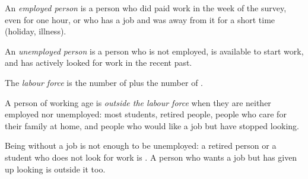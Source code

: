 \begin{definition}\label{def:g8:jobs-wages-unemployment:employed}
An \emph{employed person} is a person who did paid work in the week of the
survey, even for one hour, or who has a job and was away from it for a short time (holiday,
illness).
\end{definition}

\begin{definition}\label{def:g8:jobs-wages-unemployment:unemployed}
An \emph{unemployed person} is a person who is not employed, is available
to start work, and has actively looked for work in the recent past.
\end{definition}

\begin{definition}\label{def:g8:jobs-wages-unemployment:labour-force}
The \emph{labour force} is the number of  plus the number of
.
\end{definition}

\begin{definition}\label{def:g8:jobs-wages-unemployment:outside}
A person of working age is \emph{outside the labour force} when
they are neither employed nor unemployed: most students, retired people, people who care for their
family at home, and people who would like a job but have stopped looking.
\end{definition}

Being without a job is not enough to be unemployed: a retired person or a student who does not look
for work is . A person who wants a job but has given up looking is outside
it too.

